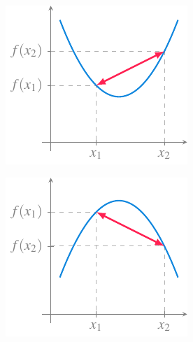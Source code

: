 \documentclass[
  a4paper,
]{scrreport}
\theoremstyle{definition}
\theoremstyle{plain}
\theoremstyle{definition}
\theoremstyle{definition}
\theoremstyle{plain}
\theoremstyle{plain}
\theoremstyle{remark}
\begin{document}
\begin{figure}

\begin{minipage}{0.50\linewidth}

\begin{figure}[H]

{\centering \includegraphics{./img/funciones/funcion-concava-arriba.pdf}

}


\end{figure}%

\end{minipage}%
%
\begin{minipage}{0.50\linewidth}

\begin{figure}[H]

{\centering \includegraphics{./img/funciones/funcion-concava-abajo.pdf}

}


\end{figure}%

\end{minipage}%

\end{figure}%
\end{document}
